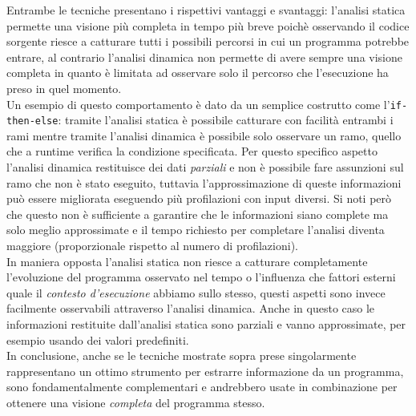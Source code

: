 Entrambe le tecniche presentano i rispettivi vantaggi e svantaggi: l'analisi statica permette una visione più completa in tempo più breve poichè osservando il codice sorgente riesce a catturare tutti i possibili percorsi in cui un programma potrebbe entrare, al contrario l'analisi dinamica non permette di avere sempre una visione completa in quanto è limitata ad osservare solo il percorso che l'esecuzione ha preso in quel momento.\\
Un esempio di questo comportamento è dato da un semplice costrutto come l'\texttt{if-then-else}: tramite l'analisi statica è possibile catturare con facilità entrambi i rami mentre tramite l'analisi dinamica è possibile solo osservare un ramo, quello che a runtime verifica la condizione specificata. Per questo specifico aspetto l'analisi dinamica restituisce dei dati \emph{parziali} e non è possibile fare assunzioni sul ramo che non è stato eseguito, tuttavia l'approssimazione di queste informazioni può essere migliorata eseguendo più profilazioni con input diversi. Si noti però che questo non è sufficiente a garantire che le informazioni siano complete ma solo meglio approssimate e il tempo richiesto per completare l'analisi diventa maggiore (proporzionale rispetto al numero di profilazioni).\\
In maniera opposta l'analisi statica non riesce a catturare completamente l'evoluzione del programma osservato nel tempo o l'influenza che fattori esterni quale il \emph{contesto d'esecuzione} abbiamo sullo stesso, questi aspetti sono invece facilmente osservabili attraverso l'analisi dinamica. Anche in questo caso le informazioni restituite dall'analisi statica sono parziali e vanno approssimate, per esempio usando dei valori predefiniti.\bigskip \\
In conclusione, anche se le tecniche mostrate sopra prese singolarmente rappresentano un ottimo strumento per estrarre informazione da un programma, sono fondamentalmente complementari e andrebbero usate in combinazione per ottenere una visione \emph{completa} del programma stesso.



